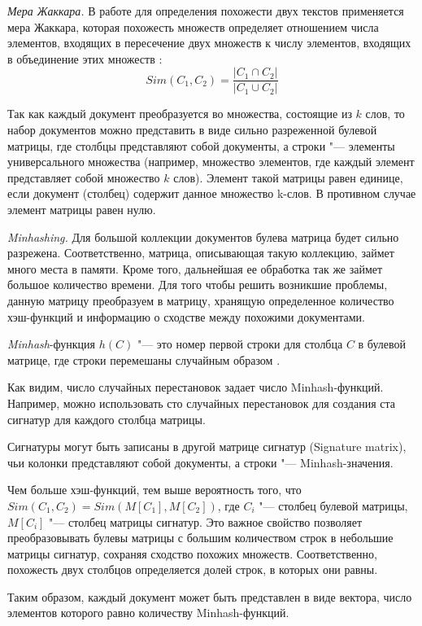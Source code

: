 \textit{Мера Жаккара.} В работе для определения похожести двух текстов применяется мера Жаккара, которая похожесть множеств определяет отношением числа элементов, входящих в пересечение двух множеств к числу элементов, входящих в объединение этих множеств \cite{SingthongchaiNiwattanakul}:
\[
\textit{Sim}(C_1, C_2) = \frac{\lvert C_1 \cap C_2\rvert}{\lvert C_1 \cup C_2\rvert}
\]

Так как каждый документ преобразуется во множества, состоящие из \(k\) слов, то набор документов можно представить в виде сильно разреженной булевой матрицы, где столбцы представляют собой документы, а строки "--- элементы универсального множества (например, множество элементов, где каждый элемент представляет собой множество \(k\) слов). Элемент такой матрицы равен единице, если документ (столбец) содержит данное множество k-слов. В противном случае элемент матрицы равен нулю.

\textit{Minhashing.} Для большой коллекции документов булева матрица будет сильно разрежена. Соответственно, матрица, описывающая такую коллекцию, займет много места в памяти. Кроме того, дальнейшая ее обработка так же займет большое количество времени. Для того чтобы решить возникшие проблемы, данную матрицу преобразуем в матрицу, хранящую определенное количество хэш-функций и информацию о сходстве между похожими документами.

\textit{Minhash}-функция \(h(C)\) "--- это номер первой строки для столбца \(C\) в булевой матрице, где строки перемешаны случайным образом \cite{ChumPerdochMatas}.

Как видим, число случайных перестановок задает число Minhash-функций. Например, можно использовать сто случайных перестановок для создания ста сигнатур для каждого столбца матрицы.

Сигнатуры могут быть записаны в другой матрице сигнатур (Signature matrix), чьи колонки представляют собой документы, а строки "--- Minhash-значения.

Чем больше хэш-функций, тем выше вероятность того, что \(\textit{Sim}(C_1, C_2) = \textit{Sim}(M[C_1], M[C_2])\), где \(C_i\) "--- столбец булевой матрицы, \(M[C_i]\) "--- столбец матрицы сигнатур. Это важное свойство позволяет преобразовывать булевы матрицы с большим количеством строк в небольшие матрицы сигнатур, сохраняя сходство похожих множеств. Соответственно, похожесть двух столбцов определяется долей строк, в которых они равны.

Таким образом, каждый документ может быть представлен в виде вектора, число элементов которого равно количеству Minhash-функций.

